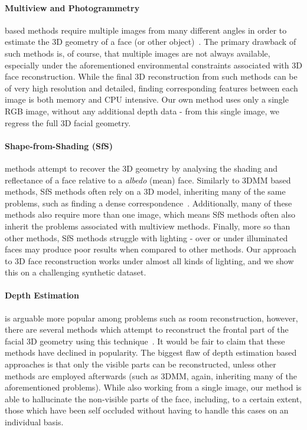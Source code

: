 \paragraph{Multiview and Photogrammetry} based methods require
multiple images from many different angles in order to estimate the 3D
geometry of a face (or other
object)~\cite{dou2018multi,dai2018coarse,Piotraschke_2016_CVPR,mayo20093d}. The
primary drawback of such methods is, of course, that multiple images
are not always available, especially under the aforementioned
environmental constraints associated with 3D face
reconstruction. While the final 3D reconstruction from such methods
can be of very high resolution and detailed, finding corresponding
features between each image is both memory and CPU intensive. Our own
method uses only a single RGB image, without any additional depth data
- from this single image, we regress the full 3D facial geometry.

\paragraph{Shape-from-Shading (SfS)} methods attempt to recover the 3D
geometry by analysing the shading and reflectance of a face relative
to a \textit{albedo} (mean) face. Similarly to 3DMM based methods, SfS
methods often rely on a 3D model, inheriting many of the same
problems, such as finding a dense
correspondence~\cite{suwajanakorn2014total,jiang20183d}. Additionally,
many of these methods also require more than one image, which means
SfS methods often also inherit the problems associated with multiview
methods. Finally, more so than other methods, SfS methods struggle
with lighting - over or under illuminated faces may produce poor
results when compared to other methods. Our approach to 3D face
reconstruction works under almost all kinds of lighting, and we show
this on a challenging synthetic dataset.

\paragraph{Depth Estimation} is arguable more popular among problems
such as room reconstruction, however, there are several methods which
attempt to reconstruct the frontal part of the facial 3D geometry
using this technique~\cite{sun2011depth,sun2013depth}. It would be
fair to claim that these methods have declined in popularity. The
biggest flaw of depth estimation based approaches is that only the
visible parts can be reconstructed, unless other methods are employed
afterwards (such as 3DMM, again, inheriting many of the aforementioned
problems). While also working from a single image, our method is able
to hallucinate the non-visible parts of the face, including, to a
certain extent, those which have been self occluded without having to
handle this cases on an individual basis.

